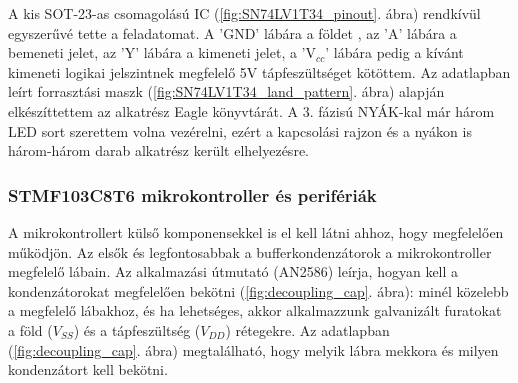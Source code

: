 \documentclass[../main.tex]{subfiles}
\begin{document}
            
            A kis SOT-23-as csomagolású IC (\ref{fig:SN74LV1T34_pinout}. ábra) rendkívül egyszerűvé tette a feladatomat. A 'GND' lábára a földet , az 'A' lábára a bemeneti jelet, az 'Y' lábára a kimeneti jelet, a 'V$_{cc}$' lábára pedig a kívánt kimeneti logikai jelszintnek megfelelő 5V tápfeszültséget %
            kötöttem. Az adatlapban\cite{ds_sn74} leírt forrasztási maszk (\ref{fig:SN74LV1T34_land_pattern}. ábra) alapján elkészíttettem az alkatrész Eagle könyvtárát. A 3. fázisú NYÁK-kal már három LED sort szerettem volna vezérelni, ezért a kapcsolási rajzon és a nyákon is három-három darab alkatrész került elhelyezésre.
            
        
        \subsubsection{STMF103C8T6 mikrokontroller és perifériák}
            A mikrokontrollert külső komponensekkel is el kell látni ahhoz, hogy megfelelően működjön. Az elsők és legfontosabbak a bufferkondenzátorok a mikrokontroller megfelelő lábain. Az alkalmazási útmutató (AN2586\cite{an2586}) leírja, hogyan kell a kondenzátorokat megfelelően bekötni (\ref{fig:decoupling_cap}. ábra): minél közelebb a megfelelő lábakhoz, és ha lehetséges, akkor alkalmazzunk galvanizált furatokat a föld ($V_{SS}$) és a tápfeszültség ($V_{DD}$) rétegekre. Az adatlapban (\ref{fig:decoupling_cap}. ábra) megtalálható, hogy melyik lábra mekkora és milyen kondenzátort kell bekötni.
            
\end{document}

